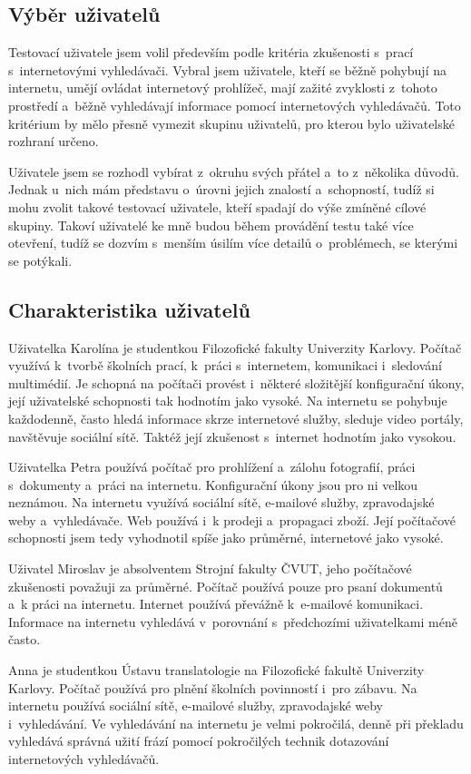 \subsection{Výběr uživatelů}
Testovací uživatele jsem volil především podle kritéria zkušenosti s~prací s~internetovými vyhledávači. Vybral jsem uživatele, kteří se běžně pohybují na internetu, umějí ovládat internetový prohlížeč, mají zažité zvyklosti z~tohoto prostředí a~běžně vyhledávají informace pomocí internetových vyhledávačů. Toto kritérium by mělo přesně vymezit skupinu uživatelů, pro kterou bylo uživatelské rozhraní určeno.

Uživatele jsem se rozhodl vybírat z~okruhu svých přátel a~to z~několika důvodů. Jednak u~nich mám představu o~úrovni jejich znalostí a~schopností, tudíž si mohu zvolit takové testovací uživatele, kteří spadají do výše zmíněné cílové skupiny. Takoví uživatelé ke mně budou během provádění testu také více otevření, tudíž se dozvím s~menším úsilím více detailů o~problémech, se kterými se potýkali.

\subsection{Charakteristika uživatelů}
Uživatelka Karolína je studentkou Filozofické fakulty Univerzity Karlovy. Počítač využívá k~tvorbě školních prací, k~práci s~internetem, komunikaci i~sledování multimédií. Je schopná na počítači provést i~některé složitější konfigurační úkony, její uživatelské schopnosti tak hodnotím jako vysoké. Na internetu se pohybuje každodenně, často hledá informace skrze internetové služby, sleduje video portály, navštěvuje sociální sítě. Taktéž její zkušenost s~internet hodnotím jako vysokou.

Uživatelka Petra používá počítač pro prohlížení a~zálohu fotografií, práci s~dokumenty a~práci na internetu. Konfigurační úkony jsou pro ni velkou neznámou. Na internetu využívá sociální sítě, e-mailové služby, zpravodajské weby a~vyhledávače. Web používá i~k prodeji a~propagaci zboží. Její počítačové schopnosti jsem tedy vyhodnotil spíše jako průměrné, internetové jako vysoké.

Uživatel Miroslav je absolventem Strojní fakulty ČVUT, jeho počítačové zkušenosti považuji za průměrné. Počítač používá pouze pro psaní dokumentů a~k práci na internetu. Internet používá převážně k~e-mailové komunikaci. Informace na internetu vyhledává v~porovnání s~předchozími uživatelkami méně často.

Anna je studentkou Ústavu translatologie na Filozofické fakultě Univerzity Karlovy. Počítač používá pro plnění školních povinností i~pro zábavu. Na internetu používá sociální sítě, e-mailové služby, zpravodajské weby i~vyhledávání. Ve vyhledávání na internetu je velmi pokročilá, denně při překladu vyhledává správná užití frází pomocí pokročilých technik dotazování internetových vyhledávačů.

